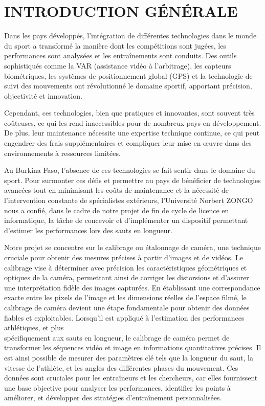 \chapter*{INTRODUCTION GÉNÉRALE}
\adjustmtc
\thispagestyle{MyStyle}


  Dans les pays développés, l'intégration de différentes technologies dans le monde du sport a transformé la manière dont les compétitions sont jugées, les performances sont analysées et les entraînements sont conduits. Des outils sophistiqués comme la VAR (assistance vidéo à l'arbitrage), les capteurs biométriques, les systèmes de positionnement global (GPS) et la technologie de suivi des mouvements ont révolutionné le domaine sportif, apportant précision, objectivité et innovation.
  
  Cependant, ces technologies, bien que pratiques et innovantes, sont souvent très coûteuses, ce qui les rend inaccessibles pour de nombreux pays en développement. De plus, leur maintenance nécessite une expertise technique continue, ce qui peut engendrer des frais supplémentaires et compliquer leur mise en œuvre dans des environnements à ressources limitées.
  
  Au Burkina Faso, l'absence de ces technologies se fait sentir dans le domaine du sport. Pour surmonter ces défis et permettre au pays de bénéficier de technologies avancées tout en minimisant les coûts de maintenance et la nécessité de l'intervention constante de spécialistes extérieurs, l'Université Norbert ZONGO nous a confié, dans le cadre de notre projet de fin de cycle de licence en informatique, la tâche de concevoir et d'implémenter un dispositif permettant d'estimer les performances lors des sauts en longueur.
  
  Notre projet se concentre sur le calibrage ou étalonnage de caméra, une technique cruciale pour obtenir des mesures précises à partir d'images et de vidéos. Le calibrage vise à déterminer avec précision les caractéristiques géométriques et optiques de la caméra, permettant ainsi de corriger les distorsions et d'assurer une interprétation fidèle des images capturées. En établissant une correspondance exacte entre les pixels de l'image et les dimensions réelles de l'espace filmé, le calibrage de caméra devient une étape fondamentale pour obtenir des données fiables et exploitables. Lorsqu'il est appliqué à l'estimation des performances athlétiques, et plus \\ spécifiquement aux sauts en longueur, le calibrage de caméra permet de transformer les séquences vidéo et image en informations quantitatives précises. Il est ainsi possible de mesurer des paramètres clé tels que la longueur du saut, la vitesse de l'athlète, et les angles des différentes phases du mouvement. Ces données sont cruciales pour les entraîneurs et les chercheurs, car elles fournissent une base objective pour analyser les performances, identifier les points à améliorer, et développer des stratégies d'entraînement personnalisées.
  
